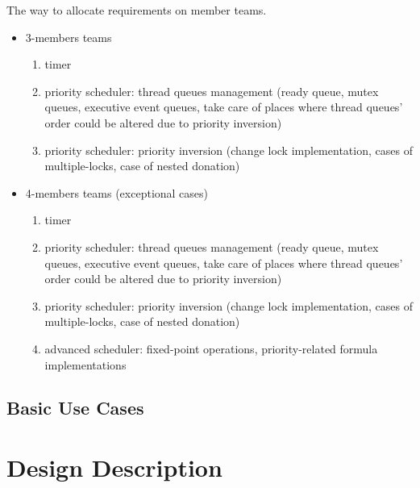 The way to allocate requirements on member teams. 
\begin{itemize}
    \item 3-members teams
        \begin{enumerate}
            \item timer
            
            \item priority scheduler: thread queues management (ready queue, mutex queues, executive event queues, take care of places where thread queues' order could be altered due to priority inversion)
            
            \item priority scheduler: priority inversion (change lock implementation, cases of multiple-locks, case of nested donation)
            
        \end{enumerate}

    \item 4-members teams (exceptional cases)
        \begin{enumerate}
            \item timer
            
            \item priority scheduler: thread queues management (ready queue, mutex queues, executive event queues, take care of places where thread queues' order could be altered due to priority inversion)
            
            \item priority scheduler: priority inversion (change lock implementation, cases of multiple-locks, case of nested donation)
            
            \item advanced scheduler: fixed-point operations, priority-related formula implementations            
        \end{enumerate}

\end{itemize}



\subsection{Basic Use Cases}



\section{Design Description}

